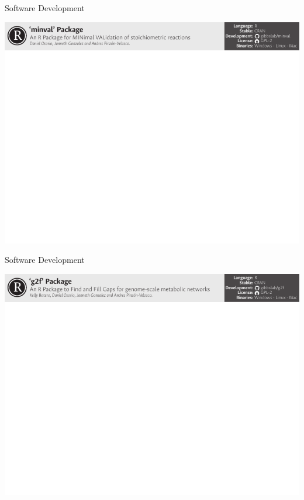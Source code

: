 \documentclass[11pt]{beamer}
\begin{document}
\begin{frame}{Software Development}
\begin{center}
\includegraphics[width=\textwidth]{minval}
\end{center}
\end{frame}
\begin{frame}{Software Development}
\begin{center}
\includegraphics[width=\textwidth]{g2f}
\end{center}
\end{frame}
\end{document}
